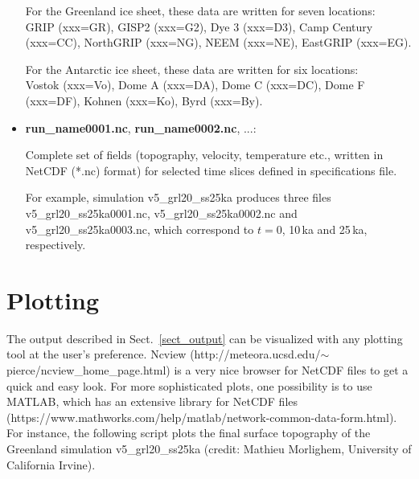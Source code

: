 \documentclass[12pt,a4paper]{article}
\begin{document}
\begin{itemize}
For the Greenland ice sheet, these data are written for seven locations:
\\
GRIP (xxx=GR), GISP2 (xxx=G2), Dye 3 (xxx=D3), Camp Century (xxx=CC), NorthGRIP (xxx=NG), NEEM (xxx=NE), EastGRIP (xxx=EG).

For the Antarctic ice sheet, these data are written for six locations:
\\
Vostok (xxx=Vo), Dome A (xxx=DA), Dome C (xxx=DC), Dome F (xxx=DF), Kohnen (xxx=Ko), Byrd (xxx=By).

\item \textbf{run\_name0001.nc}, \textbf{run\_name0002.nc}, ...:

Complete set of fields (topography, velocity, temperature etc., written in NetCDF (*.nc) format) for selected time slices defined in specifications file.

For example, simulation v5\_grl20\_ss25ka produces three files
\\
v5\_grl20\_ss25ka0001.nc, v5\_grl20\_ss25ka0002.nc and v5\_grl20\_ss25ka0003.nc, which correspond to $t=0$, 10\,ka and 25\,ka, respectively.

\end{itemize}



\section{Plotting}
\label{sect_plotting}

The output described in Sect.~\ref{sect_output} can be visualized with any plotting tool at the user's preference. Ncview (http://meteora.ucsd.edu/$\sim${}pierce/ncview\_home\_page.html) is a very nice browser for NetCDF files to get a quick and easy look. For more sophisticated plots, one possibility is to use MATLAB, which has an extensive library for NetCDF files (https://www.mathworks.com/help/matlab/network-common-data-form.html). For instance, the following script plots the final surface topography of the Greenland simulation v5\_grl20\_ss25ka (credit: Mathieu Morlighem, University of California Irvine).

\vspace*{2ex}
\end{document}
